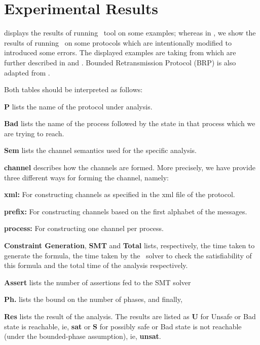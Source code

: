 \section{Experimental Results}

 displays the results of running \MPass\ tool on  some examples;
whereas in , we show the  results of running \MPass\ on some protocols which are intentionally modified to introduced some errors.
The displayed  examples are   taking  from \cite{JRSVgit}  which are further described in \cite{MPSV11} and \cite{RSV11}.
Bounded Retransmission Protocol (BRP) is also adapted from \cite{AABJ04}.

Both tables should be interpreted as follows:

\begin{inparaenum}
\item {\bf P} lists the name of the protocol under analysis.
\item {\bf Bad} lists the name of the process followed by the state in that process which we are trying to reach.
\item {\bf Sem} lists the channel semantics used for the specific analysis.
\item {\bf channel} describes how the    channels are formed.  More precisely, we have provide three different ways for forming the channel, namely:
\begin{inparaenum}
\item {\bf xml:}  For constructing  channels as specified in the xml  file of the protocol.
\item {\bf prefix:} For constructing channels based on the first alphabet of the messages.
\item {\bf process:} For constructing  one channel per process.
\end{inparaenum}
\item {\bf Constraint Generation}, {\bf SMT} and {\bf Total} lists, respectively, the time taken to generate  the \smt\-formula,
the time taken by the \smt\ solver to check the satisfiability of this formula and the total time of the analysis respectively.
\item {\bf Assert} lists the number of assertions fed to the SMT solver
\item {\bf Ph.} lists the bound on the number of phases, and finally,
\item {\bf Res} lists the result of the analysis. The results are listed as {\bf U} for Unsafe or Bad state is reachable, ie, {\bf sat} or {\bf S} for possibly safe or Bad state is not reachable (under the bounded-phase assumption), ie, {\bf unsat}.
\end{inparaenum}


